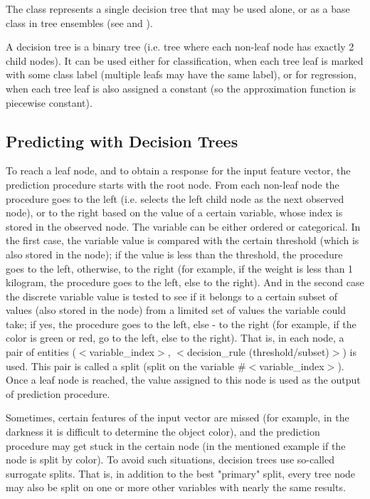 The class  represents a single decision tree that may be used alone, or as a base class in tree ensembles (see  and ).

A decision tree is a binary tree (i.e. tree where each non-leaf node has exactly 2 child nodes). It can be used either for classification, when each tree leaf is marked with some class label (multiple leafs may have the same label), or for regression, when each tree leaf is also assigned a constant (so the approximation function is piecewise constant).

\subsection{Predicting with Decision Trees}

To reach a leaf node, and to obtain a response for the input feature vector, the prediction procedure starts with the root node. From each non-leaf node the procedure goes to the left (i.e. selects the left child node as the next observed node), or to the right based on the value of a certain variable, whose index is stored in the observed node. The variable can be either ordered or categorical. In the first case, the variable value is compared with the certain threshold (which is also stored in the node); if the value is less than the threshold, the procedure goes to the left, otherwise, to the right (for example, if the weight is less than 1 kilogram, the procedure goes to the left, else to the right). And in the second case the discrete variable value is tested to see if it belongs to a certain subset of values (also stored in the node) from a limited set of values the variable could take; if yes, the procedure goes to the left, else - to the right (for example, if the color is green or red, go to the left, else to the right). That is, in each node, a pair of entities ($<$variable\_index$>$, $<$decision\_rule (threshold/subset)$>$) is used. This pair is called a split (split on the variable \#$<$variable\_index$>$). Once a leaf node is reached, the value assigned to this node is used as the output of prediction procedure.

Sometimes, certain features of the input vector are missed (for example, in the darkness it is difficult to determine the object color), and the prediction procedure may get stuck in the certain node (in the mentioned example if the node is split by color). To avoid such situations, decision trees use so-called surrogate splits. That is, in addition to the best "primary" split, every tree node may also be split on one or more other variables with nearly the same results.

